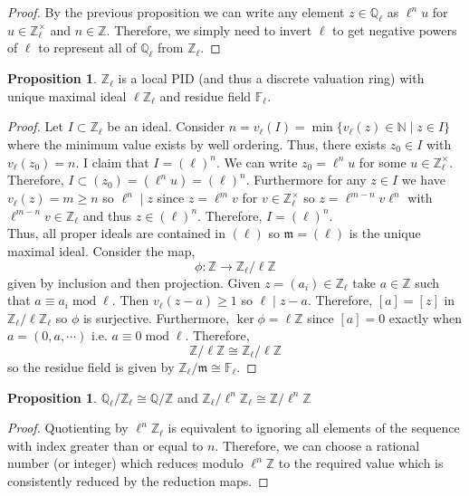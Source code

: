 \documentclass[12pt]{article}
\newcommand{\divides}{\mid}
\newcommand{\Z}{\mathbb{Z}}
\newcommand{\N}{\mathbb{N}}
\newcommand{\Q}{\mathbb{Q}}
\newcommand{\finfield}[1]{\mathbb{F}_{#1}}
\theoremstyle{remark}
\theoremstyle{definition}
\newtheorem{proposition}[theorem]{Proposition}
\begin{document}
\begin{proof}
By the previous proposition we can write any element $z \in \Q_{\ell}$ as $\ell^{n} u$ for $u \in \Z_{\ell}^\times$ and $n \in \Z$. Therefore, we simply need to invert $\ell$ to get negative powers of $\ell$ to represent all of $\Q_{\ell}$ from $\Z_{\ell}$. 
\end{proof}


\begin{proposition}
$\Z_{\ell}$ is a local PID (and thus a discrete valuation ring) with unique maximal ideal $\ell \Z_{\ell}$ and residue field $\finfield{\ell}$. 
\end{proposition}

\begin{proof}
Let $I \subset \Z_{\ell}$ be an ideal. Consider $n = v_{\ell}(I) = \min \{ v_{\ell}(z) \in \N \mid z \in I \}$ where the minimum value exists by well ordering. Thus, there exists $z_0 \in I$ with $v_{\ell}(z_0) = n$. I claim that $I = (\ell)^n$. We can write $z_0 = \ell^n u$ for some $u \in \Z_{\ell}^\times$. Therefore, $I \subset (z_0) = (\ell^n u) = (\ell)^n$. Furthermore for any $z \in I$ we have $v_{\ell}(z) = m \ge n$ so $\ell^n \divides z$ since $z = \ell^m v$ for $v \in \Z_{\ell}^\times$ so $z = \ell^{m - n} v \ell^n$ with $\ell^{m - n} v \in \Z_{\ell}$ and thus $z \in (\ell)^n$. Therefore, $I = (\ell)^n$. 
\bigskip\\
Thus, all proper ideals are contained in $(\ell)$ so $\mathfrak{m} = (\ell)$ is the unique maximal ideal. Consider the map,
\[ \phi : \Z \to \Z_{\ell} / \ell \Z \]
given by inclusion and then projection. Given $z = (a_i) \in \Z_{\ell}$ take $a \in \Z$ such that $a \equiv a_i \; \mathrm{mod} \; {\ell}$. Then $v_{\ell}(z - a) \ge 1$ so $\ell \divides z - a$. Therefore, $[a] = [z]$ in $\Z_{\ell} / \ell \Z_{\ell}$ so $\phi$ is surjective. Furthermore, $\ker{\phi} = \ell \Z$ since $[a] = 0$ exactly when $a = (0, a, \cdots)$ i.e. $a \equiv 0 \; \mathrm{mod} \; \ell$. Therefore,
\[ \Z / \ell \Z \cong \Z_{\ell} / \ell \Z \]
so the residue field is given by $\Z_{\ell} / \mathfrak{m} \cong \finfield{\ell}$.  
\end{proof}

\begin{proposition}
$\Q_{\ell} / \Z_{\ell} \cong \Q / \Z$ and $\Z_{\ell} / \ell^n \Z_{\ell} \cong \Z / \ell^n \Z$
\end{proposition}

\begin{proof}
Quotienting by $\ell^n \Z_{\ell}$ is equivalent to ignoring all elements of the sequence with index greater than or equal to $n$. Therefore, we can choose a rational number (or integer) which reduces modulo $\ell^{n} \Z$ to the required value which is consistently reduced by the reduction maps.  
\end{proof}
\end{document}
